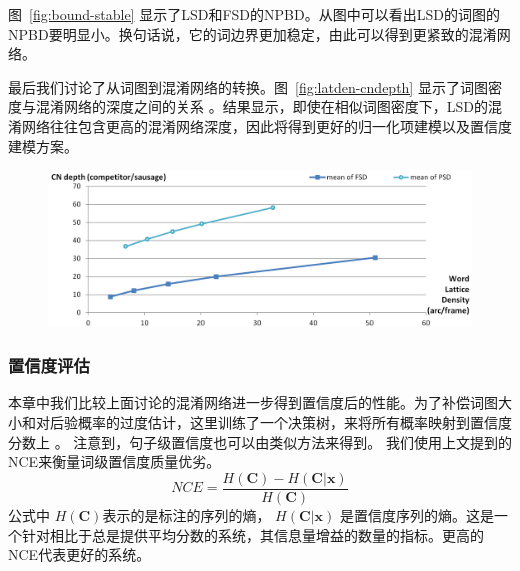 图~\ref{fig:bound-stable} 显示了LSD和FSD的NPBD。从图中可以看出LSD的词图的NPBD要明显小。换句话说，它的词边界更加稳定，由此可以得到更紧致的混淆网络。

最后我们讨论了从词图到混淆网络的转换。图~\ref{fig:latden-cndepth} 显示了词图密度与混淆网络的深度之间的关系 \cite{hakkani2006beyond}。结果显示，即使在相似词图密度下，LSD的混淆网络往往包含更高的混淆网络深度，因此将得到更好的归一化项建模以及置信度建模方案。 


\begin{figure}[!htp]
  \centering
    \captionstyle{\centering}
    \includegraphics[width=\textwidth]{figure/latden-cndepth.png}
\end{figure}






\subsubsection{置信度评估}

本章中我们比较上面讨论的混淆网络进一步得到置信度后的性能。为了补偿词图大小和对后验概率的过度估计，这里训练了一个决策树，来将所有概率映射到置信度分数上 \cite{evermann2000large}。 注意到，句子级置信度也可以由类似方法来得到。
我们使用上文提到的NCE来衡量词级置信度质量优劣。
     \begin{equation}\label{eq:nce}
    NCE=\frac{H(\mathbf{C})-H(\mathbf{C}|\mathbf{x})}{H(\mathbf{C})}
     \end{equation}
公式中 $H(\mathbf{C})$表示的是标注的序列的熵， $H(\mathbf{C}|\mathbf{x})$ 是置信度序列的熵。这是一个针对相比于总是提供平均分数的系统，其信息量增益的数量的指标。更高的NCE代表更好的系统。


